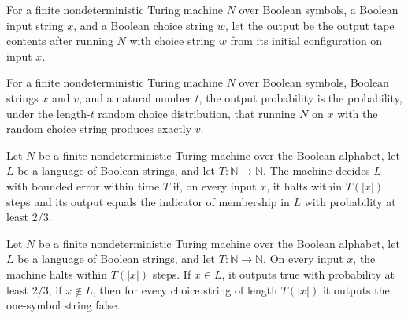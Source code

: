 \begin{definition}
\label{Turing.FinNDTM.outputWith}
\leanok
{}
For a finite nondeterministic Turing machine $N$ over Boolean symbols, a Boolean input
string $x$, and a Boolean choice string $w$, let the output be the output tape contents
after running $N$ with choice string $w$ from its initial configuration on input $x$.
\end{definition}

\begin{definition}
\label{Turing.FinNDTM.outputProb}
\leanok
{}
For a finite nondeterministic Turing machine $N$ over Boolean symbols, Boolean strings
$x$ and $v$, and a natural number $t$, the output probability is the probability, under
the length-$t$ random choice distribution, that running $N$ on $x$ with the random
choice string produces exactly $v$.
\end{definition}

\begin{definition}
\label{Turing.FinNDTM.BPDecidesInTime}
\leanok
{}
Let $N$ be a finite nondeterministic Turing machine over the Boolean alphabet, let $L$
be a language of Boolean strings, and let $T:\mathbb{N}\to\mathbb{N}$. The machine
decides $L$ with bounded error within time $T$ if, on every input $x$, it halts within
$T(|x|)$ steps and its output equals the indicator of membership in $L$ with probability
at least $2/3$.
\end{definition}

\begin{definition}
\label{Turing.FinNDTM.RDecidesInTime}
\leanok
{}
Let $N$ be a finite nondeterministic Turing machine over the Boolean alphabet, let $L$
be a language of Boolean strings, and let $T:\mathbb{N}\to\mathbb{N}$. On every input
$x$, the machine halts within $T(|x|)$ steps. If $x\in L$, it outputs true with
probability at least $2/3$; if $x\notin L$, then for every choice string of length
$T(|x|)$ it outputs the one-symbol string false.
\end{definition}


